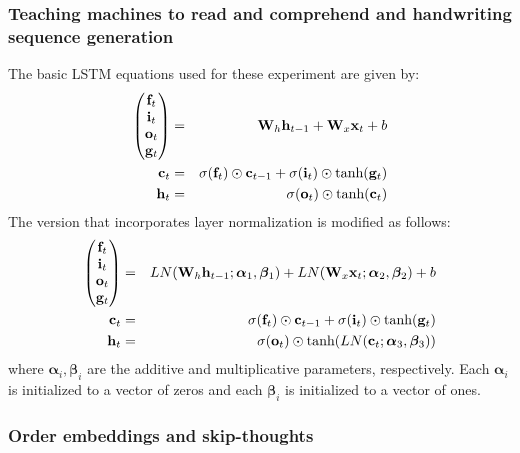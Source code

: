 \documentclass{article}
\begin{document}
\subsubsection*{Teaching machines to read and comprehend and handwriting sequence generation}

The basic LSTM equations used for these experiment are given by:
%
\begin{eqnarray}
\begin{pmatrix}{\bf f}_t\\{\bf i}_t\\{\bf o}_t\\{\bf g}_t\end{pmatrix} &=& {\bf W}_h {\bf h}_{t-1} + {\bf W}_x {\bf x}_t + b \\
{\bf c}_t &=& \sigma({\bf f}_t) \odot {\bf c}_{t-1} + \sigma({\bf i}_t) \odot \text{tanh}({\bf g}_t) \\
{\bf h}_t &=& \sigma({\bf o}_t) \odot \text{tanh}({\bf c}_t)
\end{eqnarray}
%
The version that incorporates layer normalization is modified as follows:
%
\begin{eqnarray}
\begin{pmatrix}{\bf f}_t\\{\bf i}_t\\{\bf o}_t\\{\bf g}_t\end{pmatrix} &=& LN({\bf W}_h {\bf h}_{t-1}; \bm{\alpha}_1, \bm{\beta}_1) + LN({\bf W}_x {\bf x}_t; \bm{\alpha}_2, \bm{\beta}_2) + b \\
{\bf c}_t &=& \sigma({\bf f}_t) \odot {\bf c}_{t-1} + \sigma({\bf i}_t) \odot \text{tanh}({\bf g}_t) \\
{\bf h}_t &=& \sigma({\bf o}_t) \odot \text{tanh}(LN({\bf c}_t; \bm{\alpha}_3, \bm{\beta}_3))
\end{eqnarray}
%
where $\bm{\alpha}_i, \bm{\beta}_i$ are the additive and multiplicative parameters, respectively. Each $\bm{\alpha}_i$ is initialized to a vector of zeros and each $\bm{\beta}_i$ is initialized to a vector of ones.

\subsubsection*{Order embeddings and skip-thoughts}
\end{document}
